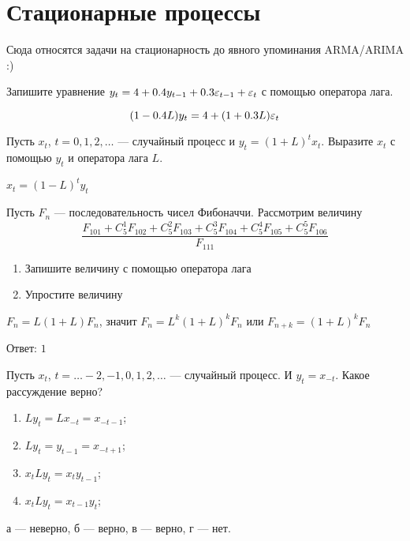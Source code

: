 

\chapter{Стационарные процессы}

Сюда относятся задачи на стационарность до явного упоминания ARMA/ARIMA :)

\begin{problem}
Запишите уравнение $y_t = 4 + 0.4y_{t-1} + 0.3\varepsilon_{t-1} + \varepsilon_t$ с помощью оператора лага.
\begin{sol}
\[
(1 - 0.4L)y_t = 4 + (1 + 0.3L)\varepsilon_t
\]
\end{sol}
\end{problem}


\begin{problem}
Пусть $x_{t}$, $t=0,1,2, \ldots$ — случайный процесс и $y_{t}=(1+L)^{t}x_{t}$.
Выразите $x_{t}$ с помощью $y_{t}$ и оператора лага $L$.

\begin{sol}
$x_{t}=(1-L)^{t}y_{t}$
\end{sol}
\end{problem}

\begin{problem}
Пусть $ F_{n} $ — последовательность чисел Фибоначчи. Рассмотрим величину
\[
\frac{F_{101}+C^{1}_{5}F_{102}+C^{2}_{5}F_{103}+C^{3}_{5}F_{104}+C^{4}_{5}F_{105}+C^{5}_{5}F_{106}}
{F_{111}}
\]
\begin{enumerate}
\item Запишите величину с помощью оператора лага
\item Упростите величину
\end{enumerate}

\begin{sol}
$ F_{n}=L(1+L)F_{n} $, значит $ F_{n}=L^{k}(1+L)^{k}F_{n} $ или $ F_{n+k}=(1+L)^{k}F_{n} $

Ответ: $1$
\end{sol}
\end{problem}




\begin{problem}
Пусть $x_{t}$, $t=\ldots -2,-1,0,1,2,\ldots $ — случайный процесс. И $y_{t}=x_{-t}$. Какое рассуждение верно?

\begin{enumerate}
\item $Ly_{t}=Lx_{-t}=x_{-t-1}$;
\item $Ly_{t}=y_{t-1}=x_{-t+1}$;
\item $x_t L y_t = x_t y_{t-1}$;
\item $x_t L y_t = x_{t-1} y_t$;
\end{enumerate}
\begin{sol}
а — неверно, б — верно, в — верно, г — нет.
\end{sol}
\end{problem}

